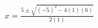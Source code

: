 \documentclass[preview]{standalone}
\begin{document}
\begin{align*}
x = \frac{5 \pm \sqrt{(-5)^2 - 4(1)(6)}}{2(1)}
\end{align*}
\end{document}
